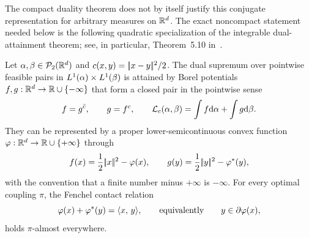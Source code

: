 The compact duality theorem does not by itself justify this conjugate representation for arbitrary measures on $\mathbb{R}^d$. The exact noncompact statement needed below is the following quadratic specialization of the integrable dual-attainment theorem; see, in particular, Theorem~5.10 in~\cite{Villani09}.

\begin{prop}\label{prop-quadratic-dual-attainment}
	Let $\alpha,\beta\in\mathcal{P}_2(\mathbb{R}^d)$ and $c(x,y)=|\!| x-y |\!|^2/2$. The dual supremum over pointwise feasible pairs in $L^1(\alpha)\times L^1(\beta)$ is attained by Borel potentials $f,g:\mathbb{R}^d\to\mathbb{R}\cup\{-\infty\}$ that form a closed pair in the pointwise sense
	\[
		f=g^{\bar c},
		\qquad
		g=f^c,
		\qquad
		\mathcal{L}_c(\alpha,\beta)=\int f\mathrm{d}\alpha+\int g\mathrm{d}\beta.
	\]
	They can be represented by a proper lower-semicontinuous convex function $\varphi:\mathbb{R}^d\to\mathbb{R}\cup\{+\infty\}$ through
	\[
		f(x)=\frac12|\!| x |\!|^2-\varphi(x),
		\qquad
		g(y)=\frac12|\!| y |\!|^2-\varphi^*(y),
	\]
	with the convention that a finite number minus $+\infty$ is $-\infty$.
	For every optimal coupling $\pi$, the Fenchel contact relation
	\[
		\varphi(x)+\varphi^*(y)=\langle x,\,y\rangle,
		\qquad\text{equivalently}\qquad y\in\partial\varphi(x),
	\]
	holds $\pi$-almost everywhere.
\end{prop}
